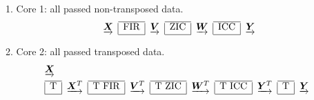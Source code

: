 1. Core 1: all passed non-transposed data. 
\begin{equation*}
    \label{eq:iir_core_1_all_non}
        \begin{array}{c|c|c|c|c|c|c}
            \cline{2-2}
            \cline{4-4}
            \cline{6-6}
            \underrightarrow{\bm{X}} & \text{FIR} & \underrightarrow{\bm{V}} & \text{ZIC} & \underrightarrow{\bm{W}} & \text{ICC} & \underrightarrow{\bm{Y}} \\
            \cline{2-2}
            \cline{4-4}
            \cline{6-6}
    \end{array}
\end{equation*}

2. Core 2: all passed transposed data.
\begin{equation*}
    \label{eq:iir_core_2_all_trans}
    \begin{aligned}
    & \underrightarrow{\bm{X}} \\
        & \begin{array}{|c|c|c|c|c|c|c|c|c|c}
            \cline{1-1}
            \cline{3-3}
            \cline{5-5}
            \cline{7-7}
            \cline{9-9}
            \text{T} & \underrightarrow{\bm{X}^T} & \text{T FIR} & \underrightarrow{\bm{V}^T} & \text{T ZIC} & \underrightarrow{\bm{W}^T} & \text{T ICC} & \underrightarrow{\bm{Y}^T} & \text{T} & \underrightarrow{\bm{Y}} \\
            \cline{1-1}
            \cline{3-3}
            \cline{5-5}
            \cline{7-7}
            \cline{9-9}
    \end{array}
\end{aligned}
\end{equation*}

